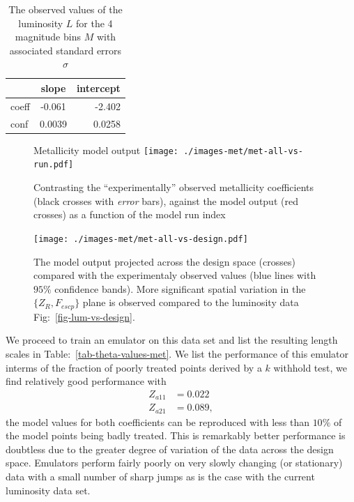 \documentclass[11pt]{article}
\begin{document}
\begin{table}
  \begin{center}
    \begin{tabular}{l c r}
      \ & slope & intercept \\
      \hline
      coeff & -0.061 & -2.402 \\
      conf & 0.0039 & 0.0258 
    \end{tabular}
    \caption{ The observed values of the luminosity $L$ for the 4 magnitude bins $M$ with associated standard errors $\sigma$}
    \label{tab-met-obs}
  \end{center}
\end{table}

\begin{figure}
\begin{center}
  \large{Metallicity model output}
  \texttt{[image: ./images-met/met-all-vs-run.pdf]}
  \caption{ Contrasting the ``experimentally'' observed metallicity coefficients (black
    crosses with \emph{error} bars), against the model output (red
    crosses) as a function of the model run index }
  \label{fig-met-vs-run}
  \end{center}
\end{figure}

\begin{figure}
  \begin{center}
    \texttt{[image: ./images-met/met-all-vs-design.pdf]}
    \caption{ The model output projected across the design space (crosses)
      compared with the experimentaly observed values (blue lines with
      $95\%$ confidence bands).  More significant spatial variation in the $\{Z_R,
      F_{escp}\}$ plane is observed
      compared to the luminosity  data Fig:~\ref{fig-lum-vs-design}.}
    \label{fig-met-all-vs-design}
  \end{center}
\end{figure}

We proceed to train an emulator on this data set and list the
resulting length scales in Table:~\ref{tab-theta-values-met}. We
list the performance of this emulator interms of the fraction of
poorly treated points derived by a $k$ withhold test, we find
relatively good performance with 
\begin{align*}
Z_{a11} &= 0.022 \\
Z_{a21} &= 0.089,
\end{align*}
the model values for both coefficients can be reproduced with less
than $10\%$ of the model points being badly treated. This is
remarkably better performance is doubtless due to the greater degree
of variation of the data across the design space. Emulators perform
fairly poorly on very slowly changing (or stationary) data with a
small number of sharp jumps as is the case with the current luminosity
data set.
\end{document}
